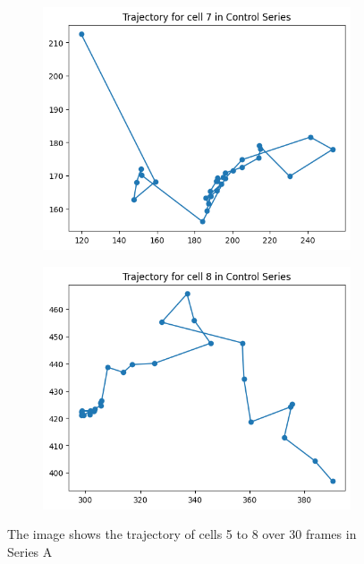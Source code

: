 \documentclass{article}
\begin{document}
\begin{figure}[h!]
\begin{subfigure}[b]{0.5\linewidth}
        \centering
        \includegraphics[width=\linewidth]{Report/Appendix_Images/Trajectory-A-Control/trajectory_7.png}
    \end{subfigure}%
    \begin{subfigure}[b]{0.5\linewidth}
        \centering
        \includegraphics[width=\linewidth]{Report/Appendix_Images/Trajectory-A-Control/trajectory_8.png}
    \end{subfigure}
    \caption{The image shows the trajectory of cells 5 to 8 over 30 frames in Series A}
    \label{fig:Trajectory-ControlSeries-5-8}
\end{figure}
\end{document}
